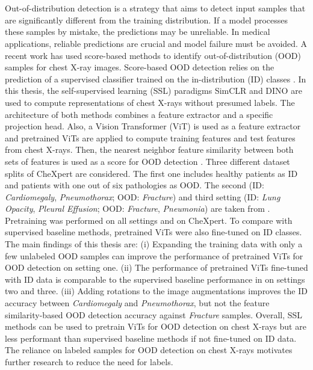 \section*{}
Out-of-distribution detection is a strategy that aims to detect input samples that are significantly different from the training distribution.
If a model processes these samples by mistake, the predictions may be unreliable.
In medical applications, reliable predictions are crucial and model failure must be avoided.
A recent work \citep{Berger2021} has used score-based methods to identify out-of-distribution (OOD) samples for chest X-ray images.
Score-based OOD detection relies on the prediction of a supervised classifier trained on the in-distribution (ID) classes \citep{Yang2021}.
In this thesis, the self-supervised learning (SSL) paradigms SimCLR \citep{Chen2020} and DINO \citep{Caron2021} are used to compute representations of chest X-rays without presumed labels.
The architecture of both methods combines a feature extractor and a specific projection head.
Also, a Vision Transformer (ViT) \citep{Dosovitskiy2020} is used as a feature extractor and pretrained ViTs are applied to compute training features and test features from chest X-rays.
Then, the nearest neighbor feature similarity between both sets of features is used as a score for OOD detection \citep{Michels2023,Sun2022}.
Three different dataset splits of CheXpert \citep{Irvin2019} are considered.
The first one includes healthy patients as ID and patients with one out of six pathologies as OOD.
The second (ID: \textit{Cardiomegaly}, \textit{Pneumothorax}; OOD: \textit{Fracture}) and third setting (ID: \textit{Lung Opacity}, \textit{Pleural Effusion}; OOD: \textit{Fracture}, \textit{Pneumonia}) are taken from \citep{Berger2021}.
Pretraining was performed on all settings and on CheXpert.
To compare with supervised baseline methods, pretrained ViTs were also fine-tuned on ID classes.
The main findings of this thesis are:
(i) Expanding the training data with only a few unlabeled OOD samples \citep{Fort2021} can improve the performance of pretrained ViTs for OOD detection on setting one.
(ii) The performance of pretrained ViTs fine-tuned with ID data is comparable to the supervised baseline performance in \citep{Berger2021} on settings two and three.
(iii) Adding rotations to the image augmentations improves the ID accuracy between \textit{Cardiomegaly} and \textit{Pneumothorax}, but not the feature similarity-based OOD detection accuracy against \textit{Fracture} samples.
Overall, SSL methods can be used to pretrain ViTs for OOD detection on chest X-rays but are less performant than supervised baseline methods if not fine-tuned on ID data.
The reliance on labeled samples for OOD detection on chest X-rays motivates further research to reduce the need for labels.
